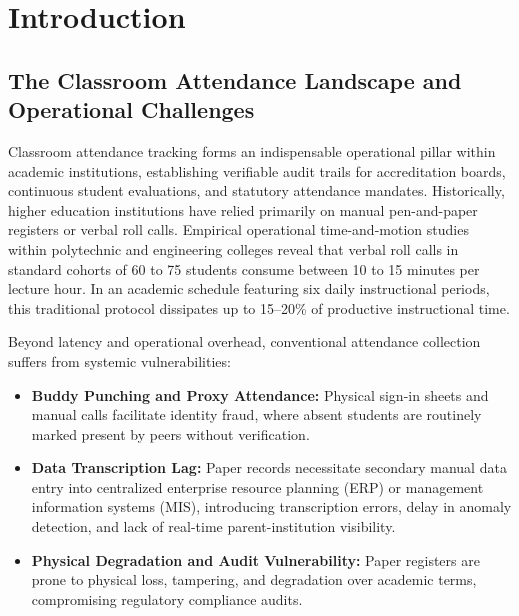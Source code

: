 \chapter{Introduction}

\section{The Classroom Attendance Landscape and Operational Challenges}
Classroom attendance tracking forms an indispensable operational pillar within academic institutions, establishing verifiable audit trails for accreditation boards, continuous student evaluations, and statutory attendance mandates. Historically, higher education institutions have relied primarily on manual pen-and-paper registers or verbal roll calls. Empirical operational time-and-motion studies within polytechnic and engineering colleges reveal that verbal roll calls in standard cohorts of 60 to 75 students consume between 10 to 15 minutes per lecture hour. In an academic schedule featuring six daily instructional periods, this traditional protocol dissipates up to 15--20\% of productive instructional time.

Beyond latency and operational overhead, conventional attendance collection suffers from systemic vulnerabilities:
\begin{itemize}
    \item \textbf{Buddy Punching and Proxy Attendance:} Physical sign-in sheets and manual calls facilitate identity fraud, where absent students are routinely marked present by peers without verification.
    \item \textbf{Data Transcription Lag:} Paper records necessitate secondary manual data entry into centralized enterprise resource planning (ERP) or management information systems (MIS), introducing transcription errors, delay in anomaly detection, and lack of real-time parent-institution visibility.
    \item \textbf{Physical Degradation and Audit Vulnerability:} Paper registers are prone to physical loss, tampering, and degradation over academic terms, compromising regulatory compliance audits.
\end{itemize}

